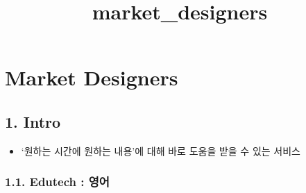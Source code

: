 \documentclass[11pt]{article}
\title{market\_designers}
\providecommand{\tightlist}{%
      \setlength{\itemsep}{0pt}\setlength{\parskip}{0pt}}
\begin{document}
    
    
    \maketitle
    
    

    
    

    

    \hypertarget{market-designers}{%
\section{Market Designers}\label{market-designers}}

\hypertarget{intro}{%
\subsection{1. Intro}\label{intro}}

\begin{itemize}
\tightlist
\item
  `원하는 시간에 원하는 내용'에 대해 바로 도움을 받을 수 있는 서비스
\end{itemize}

\hypertarget{edutech-uxc601uxc5b4}{%
\subsubsection{1.1. Edutech : 영어}\label{edutech-uxc601uxc5b4}}
\end{document}

